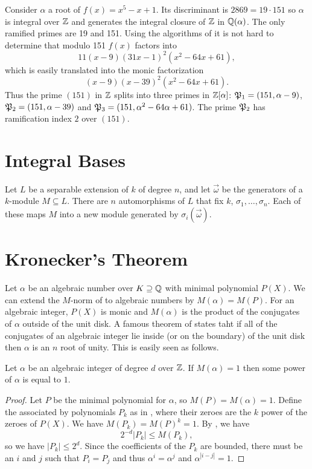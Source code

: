 Consider $\alpha$ a root of $f(x) = x^5 - x + 1$.  Its discriminant is
$2869 = 19 \cdot 151$ so $\alpha$ is integral over $\mathbb{Z}$ and generates the integral closure of $\mathbb{Z}$ in
$\mathbb{Q}(\alpha)$.  The only ramified primes are 19 and 151.  Using the
algorithms of  it is not hard to determine that
modulo 151 $f(x)$ factors into
\[
11 (x - 9) (31 x - 1)^2 (x^2 - 64 x + 61),
\]
which is easily translated into the monic factorization
\[
(x - 9) (x - 39)^2 (x^2 - 64 x + 61).
\]
Thus the prime $(151)$ in $\mathbb{Z}$ splits into three primes in $\mathbb{Z}[\alpha]$:
${\frak P}_{1} = (151, \alpha - 9)$, ${\frak P}_{2} = (151, \alpha-39)$ and
${\frak P}_{3} = (151, \alpha^{2} - 64 \alpha +61)$.  The prime ${\frak
P}_{2}$ has ramification index $2$ over $(151)$.


\section{Integral Bases}

Let $L$ be a separable extension of $k$ of degree $n$, and let $\vec
\omega$ be the generators of a $k$-module $M \subseteq L$.  There are $n$
automorphisms of $L$ that fix $k$, $\sigma_{1}, \ldots, \sigma_{n}$.  Each
of these maps $M$ into a new module generated by $\sigma_{i}(\vec \omega)$.


\section{Kronecker's Theorem}

Let $\alpha$ be an algebraic number over $K \supseteq \mathbb{Q}$ with minimal
polynomial $P(X)$.  We can extend the $M$-norm of
 to algebraic numbers by $M(\alpha) = M(P)$.
For an algebraic integer, $P(X)$ is monic and $M(\alpha)$ is the
product of the conjugates of $\alpha$ outside of the unit disk.  A
famous theorem of {\Kronecker} \cite{Kronecker57} states taht if all
of the conjugates of an algebraic integer lie inside (or on
the boundary) of the unit disk then $\alpha$ is an $n${\th} root of
unity.  This is easily seen as follows.

\begin{proposition}[Kronecker]
Let $\alpha$ be an algebraic integer of degree $d$ over $\mathbb{Z}$.   If
$M(\alpha) = 1$ then some power of $\alpha$ is equal to $1$. 
\end{proposition}

\begin{proof}
Let $P$ be the minimal polynomial for $\alpha$, so $M(P) = M(\alpha) =
1$.  Define the associated by polynomials $P_k$ as in
, where their zeroes are the $k${\th} power
of the zeroes of $P(X)$.  We have $M(P_k) = M(P)^k = 1$.   By
, we have
\[
2^{-d} |P_k| \le M(P_k),
\]
so we have $|P_k| \le 2^d$.  Since the coefficients of the $P_k$ are
bounded, there must be an $i$ and $j$ such that $P_i = P_j$ and thus
$\alpha^i = \alpha^j$ and $\alpha^{|i-j|} = 1$.
\end{proof}


